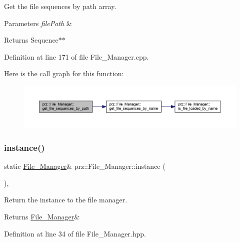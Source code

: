 Get the file sequences by path array. 


\begin{DoxyParams}{Parameters}
{\em file\+Path} & \\
\hline
\end{DoxyParams}
\begin{DoxyReturn}{Returns}
Sequence$\ast$$\ast$ 
\end{DoxyReturn}


Definition at line 171 of file File\+\_\+\+Manager.\+cpp.

Here is the call graph for this function\+:
\nopagebreak
\begin{figure}[H]
\begin{center}
\leavevmode
\includegraphics[width=350pt]{classprz_1_1_file___manager_a75c22ac120dc18a061d5c2c68f965d0b_cgraph}
\end{center}
\end{figure}
\mbox{\label{classprz_1_1_file___manager_a01f8e98b44d904709af8ec7f9bf91f3a}} 
\subsubsection{\texorpdfstring{instance()}{instance()}}
{\footnotesize\ttfamily static \mbox{\hyperlink{classprz_1_1_file___manager}{File\+\_\+\+Manager}}\& prz\+::\+File\+\_\+\+Manager\+::instance (\begin{DoxyParamCaption}{ }\end{DoxyParamCaption})\hspace{0.3cm}{\ttfamily [inline]}, {\ttfamily [static]}}



Return the instance to the file manager. 

\begin{DoxyReturn}{Returns}
\mbox{\hyperlink{classprz_1_1_file___manager}{File\+\_\+\+Manager}}\& 
\end{DoxyReturn}


Definition at line 34 of file File\+\_\+\+Manager.\+hpp.

